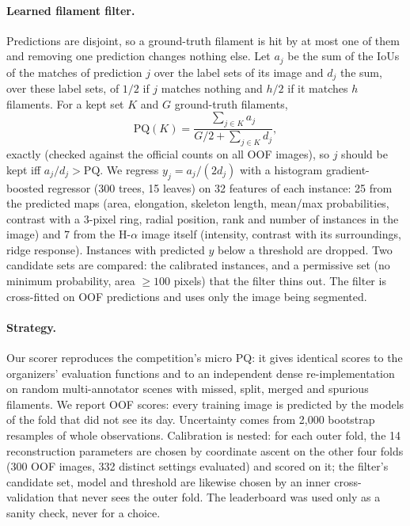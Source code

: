 \paragraph{Learned filament filter.}
Predictions are disjoint, so a ground-truth filament is hit by at most one
of them and removing one prediction changes nothing else. Let $a_j$ be the
sum of the IoUs of the matches of prediction $j$ over the label sets of its
image and $d_j$ the sum, over these label sets, of $1/2$ if $j$ matches
nothing and $h/2$ if it matches $h$ filaments. For a kept set $K$ and $G$
ground-truth filaments,
\[
  \mathrm{PQ}(K)=\frac{\sum_{j\in K}a_j}{G/2+\sum_{j\in K}d_j},
\]
exactly (checked against the official counts on all OOF images), so $j$
should be kept iff $a_j/d_j>\mathrm{PQ}$. We regress
$y_j=a_j/(2d_j)$ with a histogram gradient-boosted regressor
\cite{ke2017lightgbm,pedregosa2011sklearn} (300 trees, 15 leaves) on 32
features of each instance: 25 from the predicted maps (area, elongation,
skeleton length, mean/max probabilities, contrast with a 3-pixel ring,
radial position, rank and number of instances in the image) and 7 from the
H-$\alpha$ image itself (intensity, contrast with its surroundings, ridge
response). Instances with predicted $y$ below a threshold are dropped. Two
candidate sets are compared: the calibrated instances, and a permissive set
(no minimum probability, area $\ge100$ pixels) that the filter thins out.
The filter is cross-fitted on OOF predictions and uses only the image being
segmented.

\paragraph{Strategy.}
Our scorer reproduces the competition's micro PQ: it gives identical
scores to the organizers' evaluation functions and to an independent dense
re-implementation on random multi-annotator scenes with missed, split,
merged and spurious filaments. We report OOF scores: every
training image is predicted by the models of the fold that did not see its
day. Uncertainty comes from 2{,}000 bootstrap resamples of whole
observations. Calibration is nested: for each outer fold, the 14
reconstruction parameters are chosen by coordinate ascent on the other four
folds (300 OOF images, 332 distinct settings evaluated) and scored on it;
the filter's candidate set, model and threshold are likewise chosen by an
inner cross-validation that never sees the outer fold. The leaderboard was
used only as a sanity check, never for a choice.

